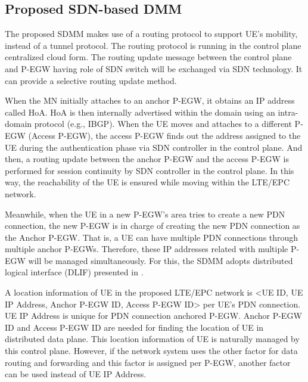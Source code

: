 \documentclass[runningheads,a4paper]{llncs}
\begin{document}
\subsection{Proposed SDN-based DMM}

The proposed SDMM makes use of a routing protocol to support UE's mobility, instead of a tunnel protocol. The routing protocol is running in the control plane centralized cloud form. The routing update message between the control plane and P-EGW having role of SDN switch will be exchanged via SDN technology. It can provide a selective routing update method.

When the MN initially attaches to an anchor P-EGW, it obtains an IP address called HoA. HoA is then internally advertised within the domain using an intra-domain protocol (e.g., IBGP). When the UE moves and attaches to a different P-EGW (Access P-EGW), the access P-EGW finds out the address assigned to the UE during the authentication phase via SDN controller in the control plane. And then, a routing update between the anchor P-EGW and the access P-EGW is performed for session continuity by SDN controller in the control plane. In this way, the reachability of the UE is ensured while moving within the LTE/EPC network.

Meanwhile, when the UE in a new P-EGW's area tries to create a new PDN connection, the new P-EGW is in charge of creating the new PDN connection as the Anchor P-EGW. That is, a UE can have multiple PDN connections through multiple anchor P-EGWs. Therefore, these IP addresses related with multiple P-EGW will be managed simultaneously. For this, the SDMM adopts distributed logical interface (DLIF) presented in \cite{ref10}.

A location information of UE in the proposed LTE/EPC network is <UE ID, UE IP Address, Anchor P-EGW ID, Access P-EGW ID> per UE's PDN connection. UE IP Address is unique for PDN connection anchored P-EGW. Anchor P-EGW ID and Access P-EGW ID are needed for finding the location of UE in distributed data plane. This location information of UE is naturally managed by this control plane. However, if the network system uses the other factor for data routing and forwarding and this factor is assigned per P-EGW, another factor can be used instead of UE IP Address.
\end{document}
